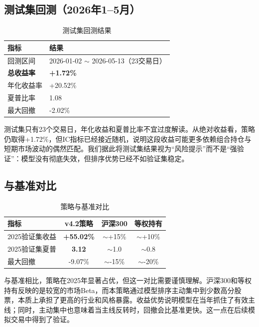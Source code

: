 \documentclass[10pt,a4paper]{ctexart}
\begin{document}
\subsection{测试集回测（2026年1--5月）}

\begin{table}[htbp]
    \centering
    \caption{测试集回测结果}
    \begin{tabular}{ll}
        \toprule
        指标 & 结果 \\
        \midrule
        回测区间 & 2026-01-02 $\sim$ 2026-05-13（23交易日） \\
        \textbf{总收益率} & \textbf{+1.72\%} \\
        年化收益率 & +20.52\% \\
        夏普比率 & 1.08 \\
        最大回撤 & -2.02\% \\
        \bottomrule
    \end{tabular}
\end{table}

测试集只有23个交易日，年化收益和夏普比率不宜过度解读。从绝对收益看，策略仍取得+1.72\%，但IC指标已经接近随机，说明这段收益可能更多依赖组合持仓与短期市场波动的偶然匹配。我们据此将测试集结果视为“风险提示”而不是“强验证”：模型没有彻底失效，但排序优势已经不如验证集稳定。

\subsection{与基准对比}

\begin{table}[htbp]
    \centering
    \caption{策略与基准对比}
    \begin{tabular}{lccc}
        \toprule
        指标 & v4.2策略 & 沪深300 & 等权持有 \\
        \midrule
        2025验证集收益 & \textbf{+55.02\%} & $\sim$+15\% & $\sim$+10\% \\
        2025验证集夏普 & \textbf{3.12} & $\sim$1.0 & $\sim$0.8 \\
        最大回撤 & -9.07\% & $\sim$-15\% & $\sim$-20\% \\
        \bottomrule
    \end{tabular}
\end{table}

与基准相比，策略在2025年显著占优，但这一对比需要谨慎理解。沪深300和等权持有反映的是较宽的市场Beta，而本策略通过模型排序主动集中到少数高分股票，本质上承担了更高的行业和风格暴露。收益优势说明模型在当年抓住了有效主线；同时，主动集中也意味着当主线反转时，回撤会比基准更快。这一点在后续模拟交易中得到了验证。
\end{document}
